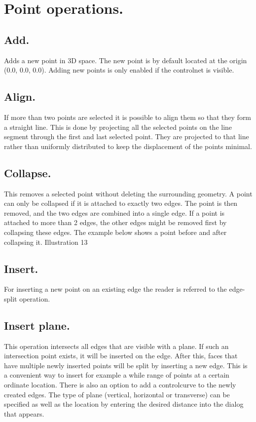 \documentclass[12pt]{article}
\begin{document}
\section{Point operations.}

\subsection{Add.}
Adds a new point in 3D space. The new point is by default located at the origin (0.0, 0.0, 0.0).
Adding new points is only enabled if the controlnet is visible.

\subsection{Align.}
If more than two points are selected it is possible to align them so that they form a straight line. This
is done by projecting all the selected points on the line segment through the first and last selected
point. They are projected to that line rather than uniformly distributed to keep the displacement of
the points minimal.

\subsection{Collapse.} \label{point-collapse}
This removes a selected point without deleting the surrounding geometry. A point can only be
collapsed if it is attached to exactly two edges. The point is then removed, and the two edges are
combined into a single edge. If a point is attached to more than 2 edges, the other edges might be
removed first by collapsing these edges. The example below shows a point before and after
collapsing it.
Illustration 13

\subsection{Insert.}
For inserting a new point on an existing edge the reader is referred to the edge-split operation.

\subsection{Insert plane.}
This operation intersects all edges that are visible with a plane. If such an intersection point exists,
it will be inserted on the edge. After this, faces that have multiple newly inserted points will be split
by inserting a new edge. This is a convenient way to insert for example a while range of points at a
certain ordinate location. There is also an option to add a controlcurve to the newly created edges.
The type of plane (vertical, horizontal or transverse) can be specified as well as the location by
entering the desired distance into the dialog that appears.
\end{document}
